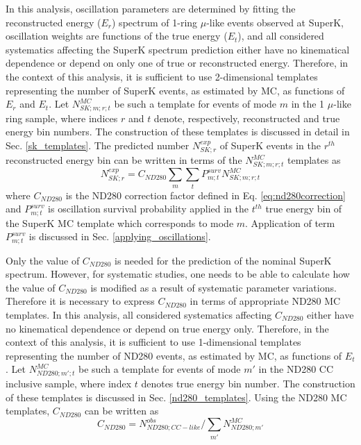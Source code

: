 In this analysis, 
oscillation parameters are determined by fitting the reconstructed energy ($E_{r}$) spectrum
of 1-ring $\mu$-like events observed at SuperK, 
oscillation weights are functions of the true energy ($E_{t}$),
and all considered systematics affecting the SuperK spectrum prediction
either have no kinematical dependence or depend 
on only one of true or reconstructed energy.
Therefore, in the context of this analysis, it is sufficient to use 2-dimensional
templates representing the number of SuperK events, as estimated by MC,
as functions of $E_{r}$ and $E_{t}$.
Let $N_{SK;m;r;t}^{MC}$ be such a template for events of mode $m$ in the 1 $\mu$-like ring sample,
where indices $r$ and $t$ denote, respectively, reconstructed and true energy bin numbers.
The construction of these templates is discussed in detail in Sec. \ref{sk_templates}.
The predicted number $N_{SK;r}^{exp}$ 
of SuperK events in the $r^{th}$ reconstructed energy bin
can be written in terms of the $N_{SK;m;r;t}^{MC}$ templates as
\begin{equation}
\displaystyle
  N_{SK;r}^{exp} = 
    C_{ND280}
    \sum_{m} \sum_{t} 
    	P_{m;t}^{surv}
	N_{SK;m;r;t}^{MC}
\label{eq:far_prediction_no_nd280_spectrum_with_sk_templates}
\end{equation}
where $C_{ND280}$ is the ND280 correction factor defined in Eq. \ref{eq:nd280correction}
and $P_{m;t}^{surv}$ is oscillation survival probability applied in the $t^{th}$ true energy
bin of the SuperK MC template which corresponds to mode $m$.
Application of term $P_{m;t}^{surv}$ is discussed in Sec. \ref{applying_oscillations}.

Only the value of $C_{ND280}$ is needed for the prediction of the nominal SuperK spectrum.
However, for systematic studies, one needs to be able to calculate how the value of $C_{ND280}$ 
is modified as a result of systematic parameter variations.
Therefore it is necessary to express $C_{ND280}$ in terms of appropriate ND280 MC templates.
In this analysis, all considered systematics affecting $C_{ND280}$
either have no kinematical dependence or depend on true energy only.
Therefore, in the context of this analysis, it is sufficient to use 1-dimensional
templates representing the number of ND280 events, as estimated by MC,
as functions of $E_{t}$.
Let $N_{ND280;m\prime;t}^{MC}$ be such a template for events of mode $m\prime$ in the
ND280 CC inclusive sample, where index $t$ denotes true energy bin number.
The construction of these templates is discussed in Sec. \ref{nd280_templates}.
Using the ND280 MC templates, $C_{ND280}$ can be written as
\begin{equation}
\displaystyle
  C_{ND280} = N^{obs}_{ND280;CC-like} / \sum_{m\prime} N^{MC}_{ND280;m\prime}
\label{eq:nd280correction_with_templates}
\end{equation}

